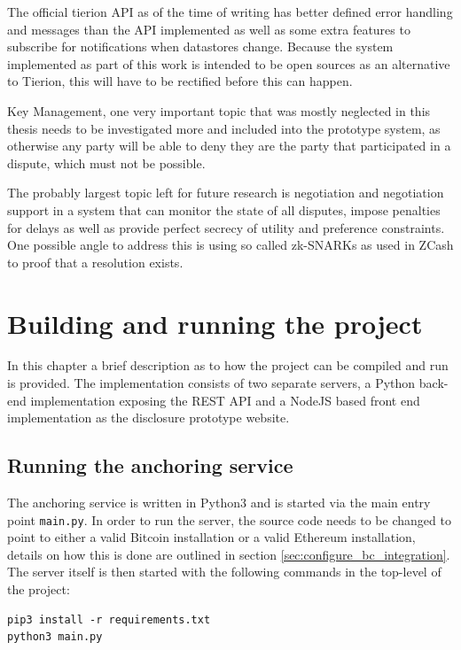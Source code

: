 \documentclass[12pt,msc,a4paper,oneside]{ucl_thesis}
\begin{document}
The official tierion API as of the time of writing has better defined error handling and messages than the API implemented as well as some extra features to subscribe for notifications when datastores change. Because the system implemented as part of this work is intended to be open sources as an alternative to Tierion, this will have to be rectified before this can happen.

Key Management, one very important topic that was mostly neglected in this thesis needs to be investigated more and included into the prototype system, as otherwise any party will be able to deny they are the party that participated in a dispute, which must not be possible.

The probably largest topic left for future research is negotiation and negotiation support in a system that can monitor the state of all disputes, impose penalties for delays as well as provide perfect secrecy of utility and preference constraints. One possible angle to address this is using so called zk-SNARKs as used in ZCash to proof that a resolution exists. 


\appendix
\chapter{Building and running the project}\label{appendix:build_and_run}
In this chapter a brief description as to how the project can be compiled and run is provided. The implementation consists of two separate servers, a Python back-end implementation exposing the REST API and a NodeJS based front end implementation as the disclosure prototype website.

\section{Running the anchoring service}
The anchoring service is written in Python3 and is started via the main entry point \texttt{main.py}. In order to run the server, the source code needs to be changed to point to either a valid Bitcoin installation or a valid Ethereum installation, details on how this is done are outlined in section \ref{sec:configure_bc_integration}. The server itself is then started with the following commands in the top-level of the project:
\begin{Code}
\begin{lstlisting}[style=myBash, caption=Set-up and run anchoring server]
pip3 install -r requirements.txt
python3 main.py
\end{lstlisting}
\end{Code}
\end{document}
